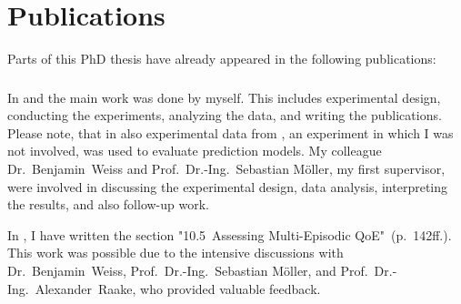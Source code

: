 \chapter*{Publications}
Parts of this PhD thesis have already appeared in the following publications:

\begin{refsection}
    \small
    \nocite{guse_macro-temporal_2013}
    \nocite{guse_modelling_2014}
    \nocite{weiss_temporal_2014}
    \printbibliography[heading=none]
\end{refsection}

\subsection*{}
In \citep{guse_macro-temporal_2013} and \citep{guse_modelling_2014} the main work was done by myself.
This includes experimental design, conducting the experiments, analyzing the data, and writing the publications.
Please note, that in \citep{guse_modelling_2014} also experimental data from \citep{moller_single-call_2011}, an experiment in which I was not involved, was used to evaluate prediction models.
My colleague Dr.~Benjamin~Weiss and Prof.~Dr.-Ing.~Sebastian Möller, my first supervisor, were involved in discussing the experimental design, data analysis, interpreting the results, and also follow-up work.

In \citep{weiss_temporal_2014}, I have written the section "10.5~Assessing Multi-Episodic QoE"~(p.~142ff.).
This work was possible due to the intensive discussions with Dr.~Benjamin~Weiss, Prof.~Dr.-Ing.~Sebastian Möller, and Prof.~Dr.-Ing.~Alexander~Raake, who provided valuable feedback.